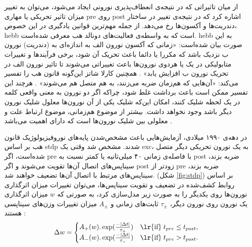 \documentclass[12pt]{report}
\begin{document}
	از میان تاثیراتی که در نتیجه‌ی انعطاف‌پذیری نورونی ایجاد می‌شود، می‌توان به تغییر میزان تاثیر تحریکی یا مهاری \gls{pre} روی \gls{post} اشاره کرد که در نتیجه‌ی تغییر در ساختار دندریت‌ها و آکسون‌ها رخ می‌دهد.
	از جمله مهم‌ترین ‌قوانین یادگیری در این خصوص، \gls{hebb}‌ است که به واسطه‌ی فعالیت‌های دونالد هب معرفی شده‌است.
	\gls{hebb} به این صورت بیان شده‌است: «زمانی که آکسون نورون الف به اندازه‌ای به (دندریت) نورون ب نزدیک  باشد که مکررا یا دائما باعث تحریک آن شود، برخی فر‌آیند‌ها و تغییرات متابولیکی در یک یا هر‌دوی نورو‌ن‌ها باعث تغییراتی می‌شوند تا تاثیر نورون الف در تحریک نورون ب افزایش یابد»
	\cite{hebb1949organization}.
	همچنین کارلا شاتز این‌گونه قانون هب را تفسیر می‌کند: «آن‌هایی که هم‌زمان ضربه می‌زنند، به ‌هم متصل ‌هم می‌شوند»
	\cite{shatz1992developing}.
	هرچند‌ این تفسیر ممکن است باعث برداشت غلط شود، چراکه اگر دو نورون به معنی واقعی کلمه در یک لحظه شلیک کنند، امکان این‌که شلیک یکی از آن نورون‌ها معلول شلیک نورون دیگر باشد وجود نخواهد داشت. بیشتر از موضوع هم‌زمانی، موضوع ارتباط علت و معلولی بین شلیک نورون‌ها است که دارای اهمیت می‌باشد
	\cite{granger1969investigating}.
	
	
	در دهه‌ی ۱۹۹۰ میلادی، آزمایش‌هایی باعث مشخص‌شدن پایه‌های نوروفیزیولوژیک قانون هب بر اساس \gls{stdp} شدند.
	\cite{caporale2008spike} 
	مشخص شد وقتی یک \gls{exc}، به یک نورون تحریکی دیگر متصل شده‌است، اگر \gls{pre} با فاصله‌ی زمانی ۴۰ میلی‌ثانیه یا کمتر نسبت به \gls{post} ضربه بزند، سیناپس‌های اتصال آن‌ها تقویت می‌شوند و اگر \gls{post} زودتر از \gls{pre} ضربه بزند، سیناپس‌های مرتبط با اتصال آن‌ها تضعیف خواهند شد. (شکل \ref{fig:stdp})
	بر اساس روابط کشف‌شده در تضعیف و تقویت سیناپس‌ها، می‌توان تغییرات میزان اثرگذاری نورون‌ها روی یکدیگر را به صورت زیر مدل‌سازی کرد، به صورتی که $w$ میزان اثرگذاری یک نورون روی نورون دیگر، $\tau_\pm$ ثابت‌های زمانی  و $A_\pm$ میزان تغییرات وزن‌های سیناپسی هستند
	\cite{gerstner2014neuronal}:
	\begin{align}
		\Delta w =
		\begin{cases}
			A_+(w).\exp(\frac{-|\Delta t|}{\tau_+})  & \text{\lr{if}}\; t_{pre} \leq t_{post}, \\
			A_-(w).\exp(\frac{-|\Delta t|}{\tau_-})  & \text{\lr{if}}\; t_{pre} > t_{post}.
		\end{cases}
		\label{eq:stdp}
	\end{align}
	
\end{document}
